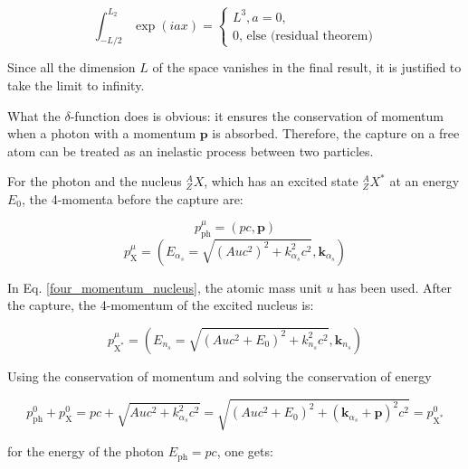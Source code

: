 \documentclass{article}
\begin{document}
\begin{equation}
	\int_{-L/2}^{L_2} \exp{ \left( i a x \right) } = 
	\begin{cases}
	L^3, a = 0,\\
	0 \text{, else (residual theorem)}
	\end{cases}
\end{equation}

Since all the dimension $L$ of the space vanishes in the final result, it is justified to take the limit to infinity.

What the $\delta$-function does is obvious: it ensures the conservation of momentum when a photon with a momentum $\mathbf{p}$ is absorbed. 
Therefore, the capture on a free atom can be treated as an inelastic process between two particles. 

For the photon and the nucleus $^A_ZX$, which has an excited state $^A_ZX^*$ at an energy $E_0$, the 4-momenta before the capture are:

\begin{equation}
\label{four_momentum_photon}
	p^\mu_{\mathrm{ph}} = \left( p c, \mathbf{p} \right)
\end{equation}
\begin{equation}
\label{four_momentum_nucleus}
	p^\mu_{\mathrm{X}} = \left( E_{\alpha_s} = \sqrt{ \left(Au c^2\right)^2 + k_{\alpha_s}^2 c^2}, \mathbf{k}_{\alpha_s} \right)
\end{equation}

In Eq. \ref{four_momentum_nucleus}, the atomic mass unit $u$ has been used.
After the capture, the 4-momentum of the excited nucleus is:

\begin{equation}
	\label{four_momentum_excited_nucleus}
	p^\mu_{\mathrm{X^*}} = \left( E_{n_s} = \sqrt{ \left( Au c^2 + E_0 \right)^2 + k_{n_s}^2 c^2}, \mathbf{k}_{n_s} \right)
\end{equation}

Using the conservation of momentum and solving the conservation of energy

\begin{equation}
	\label{conservation_of_energy}
	p^0_\mathrm{ph} + p^0_\mathrm{X} = p c + \sqrt{ Au c^2 + k_{\alpha_s}^2 c^2} = \sqrt{ \left( Au c^2 + E_0 \right)^2 + (\mathbf{k}_{\alpha_s} + \mathbf{p})^2 c^2} = p^0_\mathrm{X^*}
\end{equation}

for the energy of the photon $E_\mathrm{ph} = pc$, one gets:
\end{document}
